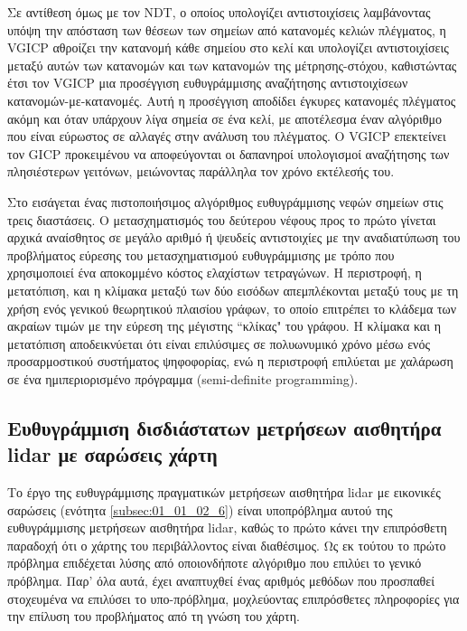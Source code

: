 Σε αντίθεση όμως με τον NDT, ο οποίος υπολογίζει αντιστοιχίσεις λαμβάνοντας
υπόψη την απόσταση των θέσεων των σημείων από κατανομές κελιών πλέγματος, η
VGICP \cite{Koide2021a} αθροίζει την κατανομή κάθε σημείου στο κελί και
υπολογίζει αντιστοιχίσεις μεταξύ αυτών των κατανομών και των κατανομών της
μέτρησης-στόχου, καθιστώντας έτσι τον VGICP μια προσέγγιση ευθυγράμμισης
αναζήτησης αντιστοιχίσεων κατανομών-με-κατανομές. Αυτή η προσέγγιση αποδίδει
έγκυρες κατανομές πλέγματος ακόμη και όταν υπάρχουν λίγα σημεία σε ένα κελί, με
αποτέλεσμα έναν αλγόριθμο που είναι εύρωστος σε αλλαγές στην ανάλυση του
πλέγματος. Ο VGICP επεκτείνει τον GICP \cite{Segal2009a} προκειμένου να
αποφεύγονται οι δαπανηροί υπολογισμοί αναζήτησης των πλησιέστερων γειτόνων,
μειώνοντας παράλληλα τον χρόνο εκτέλεσής του.

Στο \cite{Yang2021} εισάγεται ένας πιστοποιήσιμος αλγόριθμος ευθυγράμμισης
νεφών σημείων στις τρεις διαστάσεις. Ο μετασχηματισμός του δεύτερου νέφους προς
το πρώτο γίνεται αρχικά αναίσθητος σε μεγάλο αριθμό ή ψευδείς αντιστοιχίες με
την αναδιατύπωση του προβλήματος εύρεσης του μετασχηματισμού ευθυγράμμισης με
τρόπο που χρησιμοποιεί ένα αποκομμένο κόστος ελαχίστων τετραγώνων. Η
περιστροφή, η μετατόπιση, και η κλίμακα μεταξύ των δύο εισόδων απεμπλέκονται
μεταξύ τους με τη χρήση ενός γενικού θεωρητικού πλαισίου γράφων, το οποίο
επιτρέπει το κλάδεμα των ακραίων τιμών με την εύρεση της μέγιστης ``κλίκας" του
γράφου.  Η κλίμακα και η μετατόπιση αποδεικνύεται ότι είναι επιλύσιμες σε
πολυωνυμικό χρόνο μέσω ενός προσαρμοστικού συστήματος ψηφοφορίας, ενώ η
περιστροφή επιλύεται με χαλάρωση σε ένα ημιπεριορισμένο πρόγραμμα
(semi-definite programming).

\subsection{Ευθυγράμμιση δισδιάστατων μετρήσεων αισθητήρα lidar με σαρώσεις
χάρτη}
\label{subsection:02_02_02:2}

Το έργο της ευθυγράμμισης πραγματικών μετρήσεων αισθητήρα lidar με εικονικές
σαρώσεις (ενότητα \ref{subsec:01_01_02_6}) είναι υποπρόβλημα αυτού της
ευθυγράμμισης μετρήσεων αισθητήρα lidar, καθώς το πρώτο κάνει την επιπρόσθετη
παραδοχή ότι ο χάρτης του περιβάλλοντος είναι διαθέσιμος. Ως εκ τούτου το πρώτο
πρόβλημα επιδέχεται λύσης από οποιονδήποτε αλγόριθμο που επιλύει το γενικό
πρόβλημα. Παρ' όλα αυτά, έχει αναπτυχθεί ένας αριθμός μεθόδων που προσπαθεί
στοχευμένα να επιλύσει το υπο-πρόβλημα, μοχλεύοντας επιπρόσθετες πληροφορίες
για την επίλυση του προβλήματος από τη γνώση του χάρτη.

